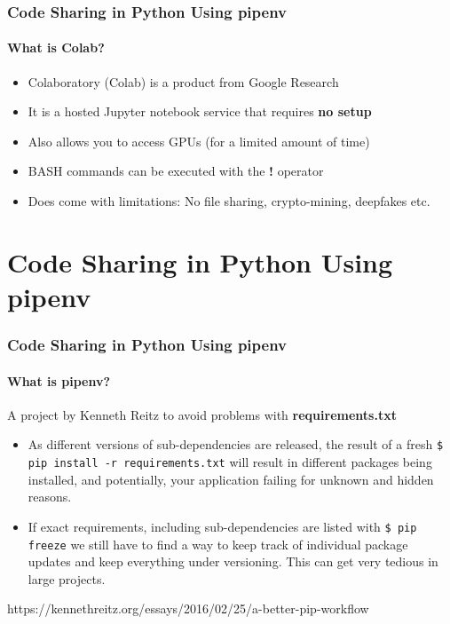 \documentclass{beamer}
\begin{document}
\begin{frame}
\frametitle{Code Sharing in Python Using pipenv}
\framesubtitle{What is Colab?}
\begin{itemize}
    \item Colaboratory (Colab) is a product from Google Research
    \item It is a hosted Jupyter notebook service that requires \textbf{no setup}
    \item Also allows you to access GPUs (for a limited amount of time)
    \item BASH commands can be executed with the \textbf{!} operator
    \item Does come with limitations: No file sharing, crypto-mining, deepfakes etc.
\end{itemize}
\end{frame}


\section{Code Sharing in Python Using pipenv}
\begin{frame}
\frametitle{Code Sharing in Python Using pipenv}
\framesubtitle{What is pipenv?}
A project by Kenneth Reitz to avoid problems with \textbf{requirements.txt}
\medskip
\begin{itemize}
    \item As different versions of sub-dependencies are released, the result of a fresh \texttt{\$ pip install -r requirements.txt}  will result in different packages being installed, and potentially, your application failing for unknown and hidden reasons.
    \item If exact requirements, including sub-dependencies are listed with \texttt{\$ pip freeze} we still have to find a way to keep track of individual package updates and keep everything under versioning. This can get very tedious in large projects.
\end{itemize}
\medskip
\footnotesize
https://kennethreitz.org/essays/2016/02/25/a-better-pip-workflow
\end{frame}
\end{document}

